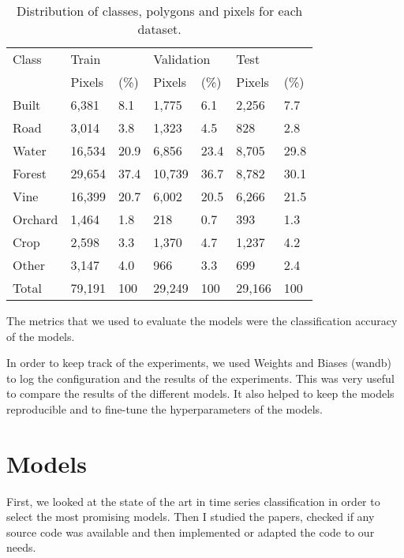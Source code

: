 \begin{table}[H]
  \centering
  \begin{tabular}{lllllll}
  \hline
  Class   & \multicolumn{2}{l}{Train} & \multicolumn{2}{l}{Validation} & \multicolumn{2}{l}{Test} \\ \cline{2-7} 
          & Pixels  & (\%) & Pixels    & (\%)    & Pixels & (\%) \\ \hline
  Built   & 6,381   & 8.1             & 1,775     & 6.1                & 2,256  & 7.7             \\
  Road    & 3,014   & 3.8             & 1,323     & 4.5                & 828    & 2.8             \\
  Water   & 16,534  & 20.9            & 6,856     & 23.4               & 8,705  & 29.8            \\
  Forest  & 29,654  & 37.4            & 10,739    & 36.7               & 8,782  & 30.1            \\
  Vine    & 16,399  & 20.7            & 6,002     & 20.5               & 6,266  & 21.5            \\
  Orchard & 1,464   & 1.8             & 218       & 0.7                & 393    & 1.3             \\
  Crop    & 2,598   & 3.3             & 1,370     & 4.7                & 1,237  & 4.2             \\
  Other   & 3,147   & 4.0             & 966       & 3.3                & 699    & 2.4             \\ \hline
  Total   & 79,191  & 100             & 29,249    & 100                & 29,166 & 100            
  \end{tabular}
  \caption{Distribution of classes, polygons and pixels for each dataset.}
\end{table}

The metrics that we used to evaluate the models were the classification accuracy of the models.

In order to keep track of the experiments, we used Weights and Biases (wandb) to log the configuration and the results of the experiments.
This was very useful to compare the results of the different models. It also helped to keep the models reproducible and to fine-tune the hyperparameters of the models.

\section{Models}
First, we looked at the state of the art in time series classification in order to select the most promising models.
Then I studied the papers, checked if any source code was available and then implemented or adapted the code to our needs.

